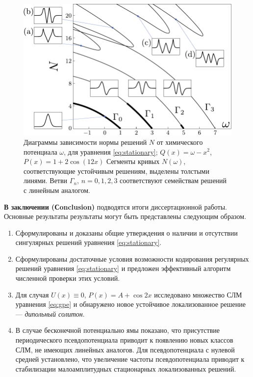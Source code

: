 \documentclass[candidate, href, colorlinks]{disser}
\begin{document}
\begin{figure}[h]
\centering
	\includegraphics[scale = 1]{pic/branches}
	\caption{
		Диаграммы зависимости нормы решений $N$ от химического потенциала $\omega$, для уравнения \eqref{eq:stationary}; $Q(x) = \omega - x^2$, $P(x) = 1 + 2 \cos (12 x)$
		Сегменты кривых $N(\omega)$, соответствующие устойчивым решениям, выделены толстыми линями.
		Ветви $\Gamma_n$, $n = 0, 1, 2, 3$ соответствуют семействам решений с линейным аналогом.
	}
\label{fig:branches}
\end{figure}


\textbf{В заключении (Сonclusion)} подводятся итоги диссертационной работы.
Основные результаты результаты могут быть представлены следующим образом.
\begin{enumerate}
	\item Сформулированы и доказаны общие утверждения о наличии и отсутствии сингулярных решений уравнения \eqref{eq:stationary}.
	\item Сформулированы достаточные условия возможности кодирования регулярных решений уравнения \eqref{eq:stationary} и предложен эффективный алгоритм численной проверки этих условий.
	\item Для случая $U(x) \equiv 0$, $P(x) = A + \cos 2x$ исследовано множество СЛМ уравнения \eqref{eq:gpe} и обнаружено новое устойчивое локализованное решение --- {\it дипольный солитон}.
	\item В случае бесконечной потенциально ямы показано, что присутствие периодического псевдопотенциала приводит к появлению новых классов СЛМ, не имеющих линейных аналогов.
		Для псевдопотенциала с нулевой средней установлено, что увеличение частоты псевдопотенциала приводит к стабилизации малоамплитудных стационарных локализованных решений.
\end{enumerate}
\end{document}
